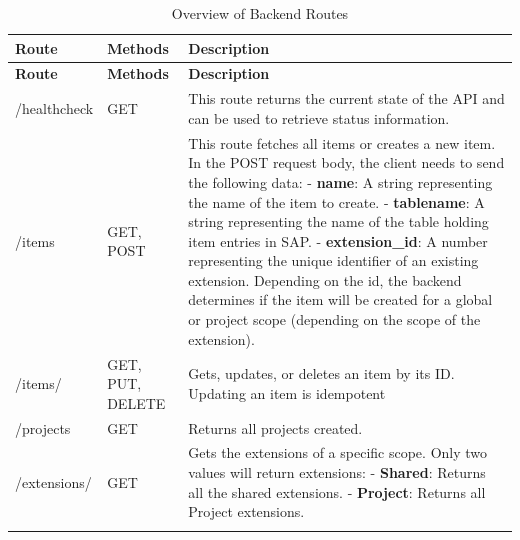 \begin{longtable}{|l|p{3cm}|>{\raggedright\arraybackslash}p{7cm}|}
    \hline
    \rowcolor{headercolor} \textbf{Route} & \textbf{Methods} & \textbf{Description} \\
    \endfirsthead

    \hline
    \rowcolor{headercolor} \textbf{Route} & \textbf{Methods} & \textbf{Description} \\
    \endhead

    \hline
    /healthcheck & GET & This route returns the current state of the API and can be used to retrieve status information. \\
    \hline
    /items & GET, POST & This route fetches all items or creates a new item.
    In the POST request body, the client needs to send the following data:
    \newline\newline  - \textbf{name}: A string representing the name of the item to create.
    \newline\newline - \textbf{tablename}: A string representing the name of the table holding item entries in SAP.
    \newline\newline - \textbf{extension\_id}: A number representing the unique identifier of an existing extension. Depending on the id, the backend determines if the item will be created for a global or project scope (depending on the scope of the extension). \\
    \hline
    /items/ & GET, PUT, DELETE & Gets, updates, or deletes an item by its ID. Updating an item is idempotent \\
    \hline
    /projects & GET & Returns all projects created. \\
    \hline
    /extensions/ & GET & Gets the extensions of a specific scope.
    Only two values will return extensions:
    \newline\newline - \textbf{Shared}: Returns all the shared extensions.
    \newline\newline - \textbf{Project}: Returns all Project extensions. \\
    \hline
    \caption{Overview of Backend Routes}
    \label{tab:table_routes}
\end{longtable}

\label{subsubsec:api-examples}

